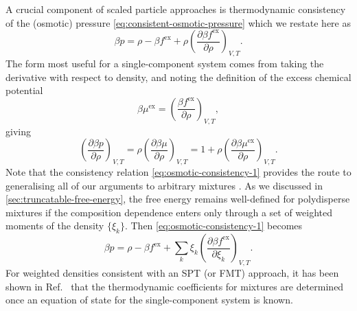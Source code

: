 \documentclass[11pt,twoside]{report}
\begin{document}
A crucial component of scaled particle approaches is thermodynamic consistency of the (osmotic) pressure \eqref{eq:consistent-osmotic-pressure} which we restate here as%
\begin{equation}\label{eq:osmotic-consistency-1}
  \beta p
  =
  \rho - \beta f^\mathrm{ex}
  + \rho \left( \frac{\partial \beta f^\mathrm{ex}}{\partial \rho} \right)_{V,T}.
\end{equation}
The form most useful for a single-component system comes from taking the derivative with respect to density, and noting the definition of the excess chemical potential
\begin{equation*}
  \beta \mu^\mathrm{ex}
  =
  \left( \frac{\beta f^\mathrm{ex}}{\partial \rho} \right)_{V,T},
\end{equation*}
giving
\begin{equation}\label{eq:osmotic-consistency-2}
    \left( \frac{\partial \beta p}{\partial \rho} \right)_{V,T}
    =
    \rho \left( \frac{\partial \beta \mu}{\partial \rho} \right)_{V,T}
    =
    1 + \rho \left( \frac{\partial \beta \mu^\mathrm{ex}}{\partial \rho} \right)_{V,T}.
\end{equation}
Note that the consistency relation \eqref{eq:osmotic-consistency-1} provides the route to generalising all of our arguments to arbitrary mixtures \cite{RosenfeldPRL1989,SollichAiCP2001,SantosPRE2012}.
As we discussed in \ref{sec:truncatable-free-energy}, the free energy remains well-defined for polydisperse mixtures if the composition dependence enters only through a set of weighted moments of the density $\{\xi_k\}$.
Then \eqref{eq:osmotic-consistency-1} becomes
\begin{equation}\label{eq:osmotic-consistency-3}
  \beta p
  =
  \rho - \beta f^\mathrm{ex}
  + \sum_k
  \xi_k \left( \frac{\partial \beta f^\mathrm{ex}}{\partial \xi_k} \right)_{V,T}.
\end{equation}
For weighted densities consistent with an SPT (or FMT) approach, it has been shown in Ref.\ \cite{SantosPRE2012} that the thermodynamic coefficients for mixtures are determined once an equation of state for the single-component system is known.
\end{document}
